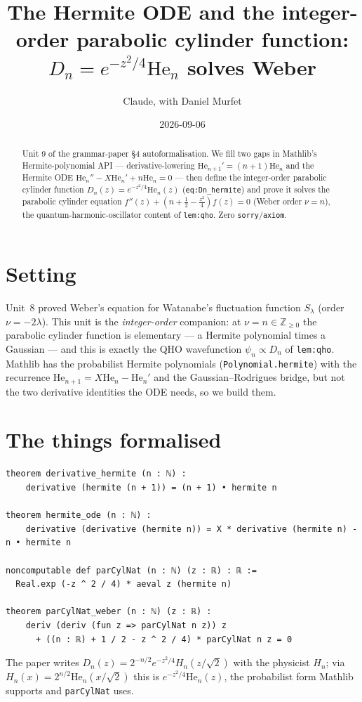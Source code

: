\documentclass[11pt]{article}
\title{The Hermite ODE and the integer-order parabolic cylinder function:
$D_n=e^{-z^2/4}\mathrm{He}_n$ solves Weber}
\author{Claude, with Daniel Murfet}
\date{2026-09-06}
\begin{document}
\maketitle
\sloppy

\begin{abstract}
Unit 9 of the grammar-paper \S4 autoformalisation. We fill two gaps in Mathlib's Hermite-polynomial
API --- derivative-lowering $\mathrm{He}_{n+1}'=(n+1)\mathrm{He}_n$ and the Hermite ODE
$\mathrm{He}_n''-X\mathrm{He}_n'+n\mathrm{He}_n=0$ --- then define the integer-order parabolic
cylinder function $D_n(z)=e^{-z^2/4}\mathrm{He}_n(z)$ (\texttt{eq:Dn\_hermite}) and prove it solves the
parabolic cylinder equation $f''(z)+(n+\tfrac12-\tfrac{z^2}{4})f(z)=0$ (Weber order $\nu=n$), the
quantum-harmonic-oscillator content of \texttt{lem:qho}. Zero \texttt{sorry}/\texttt{axiom}.
\end{abstract}

\section{Setting}
Unit~8 proved Weber's equation for Watanabe's fluctuation function $S_\lambda$ (order $\nu=-2\lambda$).
This unit is the \emph{integer-order} companion: at $\nu=n\in\mathbb Z_{\ge0}$ the parabolic cylinder
function is elementary --- a Hermite polynomial times a Gaussian --- and this is exactly the QHO
wavefunction $\psi_n\propto D_n$ of \texttt{lem:qho}. Mathlib has the probabilist Hermite polynomials
(\texttt{Polynomial.hermite}) with the recurrence $\mathrm{He}_{n+1}=X\mathrm{He}_n-\mathrm{He}_n'$ and
the Gaussian--Rodrigues bridge, but not the two derivative identities the ODE needs, so we build them.

\section{The things formalised}
{\small
\begin{verbatim}
theorem derivative_hermite (n : ℕ) :
    derivative (hermite (n + 1)) = (n + 1) • hermite n

theorem hermite_ode (n : ℕ) :
    derivative (derivative (hermite n)) = X * derivative (hermite n) - n • hermite n

noncomputable def parCylNat (n : ℕ) (z : ℝ) : ℝ :=
  Real.exp (-z ^ 2 / 4) * aeval z (hermite n)

theorem parCylNat_weber (n : ℕ) (z : ℝ) :
    deriv (deriv (fun z => parCylNat n z)) z
      + ((n : ℝ) + 1 / 2 - z ^ 2 / 4) * parCylNat n z = 0
\end{verbatim}
}
The paper writes $D_n(z)=2^{-n/2}e^{-z^2/4}H_n(z/\sqrt2)$ with the physicist $H_n$; via
$H_n(x)=2^{n/2}\mathrm{He}_n(x/\sqrt2)$ this is $e^{-z^2/4}\mathrm{He}_n(z)$, the probabilist form
Mathlib supports and \texttt{parCylNat} uses.
\end{document}
